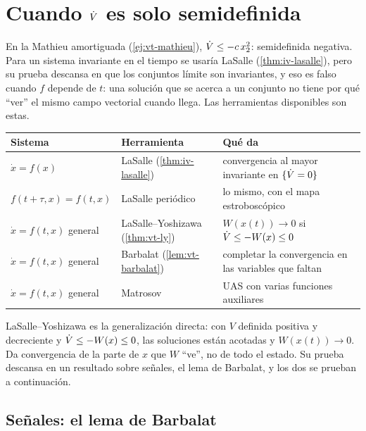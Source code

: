 \section{Cuando \texorpdfstring{$\dot V$}{dV/dt} es solo semidefinida}
\label{sec:vt-semidefinida}

En la Mathieu amortiguada (\cref{ej:vt-mathieu}), $\dot V\le-c\,x_2^2$: semidefinida negativa. Para un sistema invariante en el tiempo se usaría LaSalle (\cref{thm:iv-lasalle}), pero su prueba descansa en que los conjuntos límite son invariantes, y eso es falso cuando $f$ depende de $t$: una solución que se acerca a un conjunto no tiene por qué ``ver'' el mismo campo vectorial cuando llega. Las herramientas disponibles son estas.

\begin{center}
\small
\begin{tabular}{@{}p{3.6cm}p{3.7cm}p{4.6cm}@{}}
\toprule
Sistema & Herramienta & Qué da \\
\midrule
$\dot x=f(x)$ & LaSalle (\cref{thm:iv-lasalle}) & convergencia al mayor invariante en $\{\dot V=0\}$ \\
$f(t+\tau,x)=f(t,x)$ & LaSalle periódico & lo mismo, con el mapa estroboscópico \\
$\dot x=f(t,x)$ general & LaSalle--Yoshizawa (\cref{thm:vt-ly}) & $W(x(t))\to0$ si $\dot V\le-W(x)\le0$ \\
$\dot x=f(t,x)$ general & Barbalat (\cref{lem:vt-barbalat}) & completar la convergencia en las variables que faltan \\
$\dot x=f(t,x)$ general & Matrosov & UAS con varias funciones auxiliares \\
\bottomrule
\end{tabular}
\end{center}

LaSalle--Yoshizawa \citep{Yos66} es la generalización directa: con $V$ definida positiva y decreciente y $\dot V\le-W(x)\le0$, las soluciones están acotadas y $W(x(t))\to0$. Da convergencia de la parte de $x$ que $W$ ``ve'', no de todo el estado. Su prueba descansa en un resultado sobre señales, el lema de Barbalat, y los dos se prueban a continuación.

\subsection{Señales: el lema de Barbalat}

